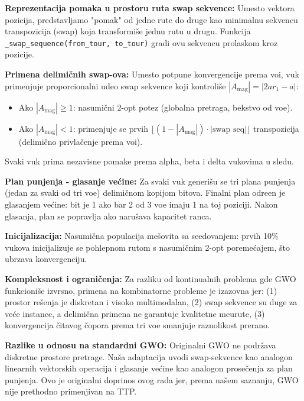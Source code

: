 \documentclass[12pt,a4paper]{article}
\begin{document}
\textbf{Reprezentacija pomaka u prostoru ruta swap sekvence:}
Umesto vektora pozicija, predstavljamo "pomak" od jedne rute do druge kao minimalnu sekvencu transpozicija (swap) koja transformi\v{s}e jednu rutu u drugu. Funkcija \texttt{\_swap\_sequence(from\_tour, to\_tour)} gradi ovu sekvencu prolaskom kroz pozicije.

\textbf{Primena delimi\v{c}nih swap-ova:}
Umesto potpune konvergencije prema vo\dj{}i, vuk primenjuje proporcionalni udeo swap sekvence koji kontroli\v{s}e $|A_{\text{mag}}| = |2ar_1 - a|$:
\begin{itemize}
    \item Ako $|A_{\text{mag}}| \geq 1$: nasumi\v{c}ni 2-opt potez (globalna pretraga, bekstvo od vo\dj{}e).
    \item Ako $|A_{\text{mag}}| < 1$: primenjuje se prvih $\lfloor (1 - |A_{\text{mag}}|) \cdot |\text{swap seq}| \rfloor$ transpozicija (delimi\v{c}no privla\v{c}enje prema vo\dj{}i).
\end{itemize}
Svaki vuk prima nezavisne pomake prema alpha, beta i delta vukovima u sledu.

\textbf{Plan punjenja - glasanje ve\'{c}ine:}
Za svaki vuk generi\v{s}u se tri plana punjenja (jedan za svaki od tri vo\dj{}e) delimi\v{c}nom kopijom bitova. Finalni plan odre\dj{}en je glasanjem ve\'{c}ine: bit je 1 ako bar 2 od 3 vo\dj{}e imaju 1 na toj poziciji. Nakon glasanja, plan se popravlja ako narušava kapacitet ranca.

\textbf{Inicijalizacija:}
Nasumi\v{c}na populacija me\v{s}ovita sa seedovanjem: prvih 10\% vukova inicijalizuje se pohlepnom rutom s nasumi\v{c}nim 2-opt poreme\'{c}ajem, \v{s}to ubrzava konvergenciju.

\textbf{Kompleksnost i ograničenja:}
Za razliku od kontinualnih problema gde GWO funkcioniše izvrsno, primena na kombinatorne probleme je izazovna jer:
(1) prostor re\v{s}enja je diskretan i visoko multimodalan,
(2) swap sekvence su duge za ve\'{c}e instance, a delimi\v{c}na primena ne garantuje kvalitetne me\dj{}urute,
(3) konvergencija \v{c}itavog \v{c}opora prema tri vo\dj{}e smanjuje raznolikost prerano.

\textbf{Razlike u odnosu na standardni GWO:} Originalni GWO ne podr\v{z}ava diskretne prostore pretrage. Na\v{s}a adaptacija uvodi swap-sekvence kao analogon linearnih vektorskih operacija i glasanje ve\'{c}ine kao analogon prose\v{c}enja za plan punjenja. Ovo je originalni doprinos ovog rada jer, prema na\v{s}em saznanju, GWO nije prethodno primenjivan na TTP.
\end{document}
